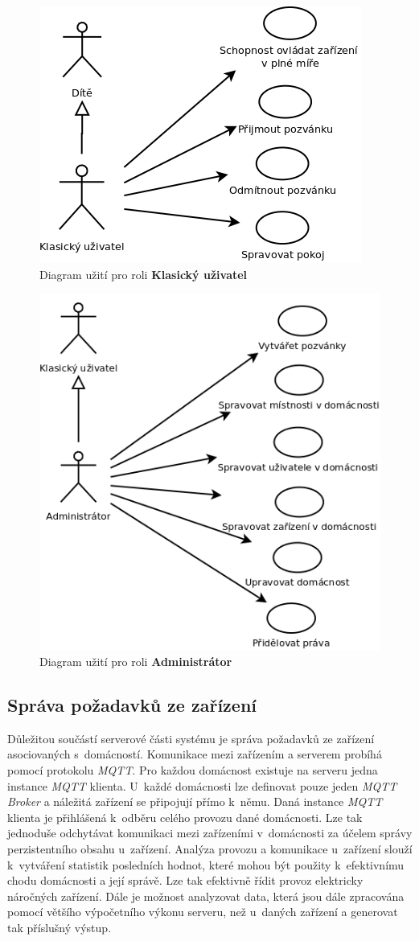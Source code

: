 \begin{figure}[hbt]
  \centering
  \includegraphics[width=0.4 \linewidth]{obrazky-figures/useCaseUser.png}
  \caption{Diagram užití pro roli \textbf{Klasický uživatel}}
  \label{figure:use_case_uzivatel}
\end{figure}

\begin{figure}[hbt]
  \centering
  \includegraphics[width=0.4 \linewidth]{obrazky-figures/useCaseAdmin.png}
  \caption{Diagram užití pro roli \textbf{Administrátor}}
  \label{figure:use_case_admin}
\end{figure}

\newpage
\subsection*{Správa požadavků ze zařízení}
\label{backend:mqtt}

Důležitou součástí serverové části systému je správa požadavků ze zařízení asociovaných s~domácností.
Komunikace mezi zařízením a serverem probíhá pomocí protokolu \emph{MQTT}.
Pro každou domácnost existuje na serveru jedna instance \emph{MQTT} klienta.
U~každé domácnosti lze definovat pouze jeden \emph{MQTT Broker} a náležitá zařízení se připojují přímo k~němu.
Daná instance \emph{MQTT} klienta je přihlášená k~odběru celého provozu dané domácnosti.
Lze tak jednoduše odchytávat komunikaci mezi zařízeními v~domácnosti za účelem správy perzistentního obsahu u~zařízení.
Analýza provozu a komunikace u~zařízení slouží k~vytváření statistik posledních hodnot, které mohou být použity k~efektivnímu chodu domácnosti a její správě.
Lze tak efektivně řídit provoz elektricky náročných zařízení. Dále je možnost analyzovat data, která jsou dále zpracována pomocí většího výpočetního výkonu serveru, než u~daných zařízení a generovat tak příslušný výstup.

